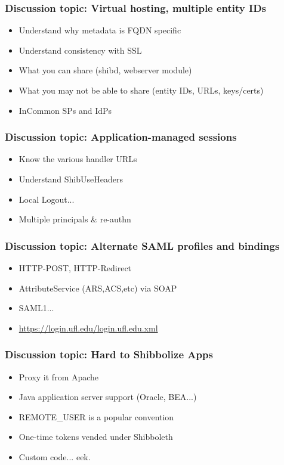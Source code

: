 \begin{frame}
\frametitle{Discussion topic: Virtual hosting, multiple entity IDs}
\begin{itemize}
\item Understand why metadata is FQDN specific
\item Understand consistency with SSL
\item What you can share (shibd, webserver module)
\item What you may not be able to share (entity IDs, URLs, keys/certs)
\item InCommon SPs and IdPs
\end{itemize}
\end{frame}

\begin{frame}
\frametitle{Discussion topic: Application-managed sessions}
\begin{itemize}
\item Know the various handler URLs 
\item Understand ShibUseHeaders 
\item Local Logout... 
\item Multiple principals \& re-authn
\end{itemize}
\end{frame}

\begin{frame}
\frametitle{Discussion topic: Alternate SAML profiles and bindings}
\begin{itemize}
\item HTTP-POST, HTTP-Redirect
\item AttributeService (ARS,ACS,etc) via SOAP
\item SAML1... 
\item \url{https://login.ufl.edu/login.ufl.edu.xml}
\end{itemize}
\end{frame}

\begin{frame}
\frametitle{Discussion topic: Hard to Shibbolize Apps }
\begin{itemize}
\item Proxy it from Apache 
\item Java application server support (Oracle, BEA...)
\item REMOTE\_USER is a popular convention
\item One-time tokens vended under Shibboleth 
\item Custom code... eek.
\end{itemize}
\end{frame}

